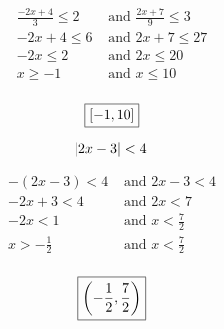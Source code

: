\documentclass[letterpaper, landscape]{exam}
\begin{document}
\begin{questions}
      \begin{solution}
        \begin{align*}
          \frac{-2x + 4}{3} \leq 2                   & \text{ and } \frac{2x + 7}{9} \leq 3 \\
          -2x + 4 \leq 6                             & \text{ and } 2x + 7 \leq 27 \\
          -2x \leq 2                                 & \text{ and } 2x \leq 20 \\
          x \geq -1                                   & \text{ and } x \leq 10 \\
        \end{align*}

        \[
          \boxed{ \intcc{ -1, 10 } }
        \]

      \end{solution}

    \ifprintanswers{}
      \newpage
    \fi

    \question[10]
      \[ 
        \abs{ 2x - 3 } < 4 
      \]

      \begin{solution}
        \begin{align*}
          -(2x - 3) < 4    & \text{ and } 2x - 3 < 4 \\
          -2x + 3 < 4      & \text{ and } 2x < 7 \\
          -2x < 1          & \text{ and } x < \frac{7}{2} \\
          x > -\frac{1}{2} & \text{ and } x < \frac{7}{2} \\
        \end{align*}

        \[
          \boxed{ \intoo{ -\frac{1}{2}, \frac{7}{2} } }
        \]

      \end{solution}

    \ifprintanswers{}
      \newpage
    \fi


\end{questions}
\end{document}
